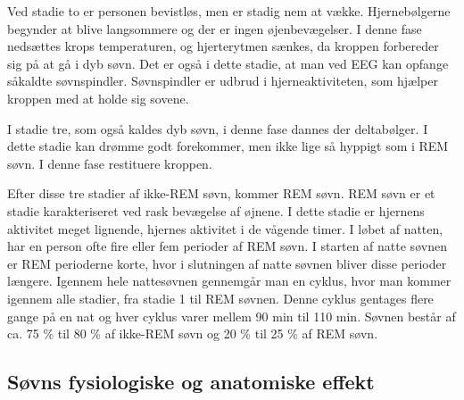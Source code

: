Ved stadie to er personen bevistløs, men er stadig nem at vække. Hjernebølgerne begynder at blive langsommere og der er ingen øjenbevægelser. I denne fase nedsættes krops temperaturen, og hjerterytmen sænkes, da kroppen forbereder sig på at gå i dyb søvn. Det er også i dette stadie, at man ved EEG kan opfange såkaldte søvnspindler. Søvnspindler er udbrud i hjerneaktiviteten, som hjælper kroppen med at holde sig sovene. \cite{Mary2011} 

I stadie tre, som også kaldes dyb søvn, i denne fase dannes der deltabølger. I dette stadie kan drømme godt forekommer, men ikke lige så hyppigt som i REM søvn. I denne fase restituere kroppen. \cite{Mary2011}  

Efter disse tre stadier af ikke-REM søvn, kommer REM søvn. REM søvn er et stadie karakteriseret ved rask bevægelse af øjnene. I dette stadie er hjernens aktivitet meget lignende, hjernes aktivitet i de vågende timer. I løbet af natten, har en person ofte fire eller fem perioder af REM søvn. I starten af natte søvnen er REM perioderne korte, hvor i slutningen af natte søvnen bliver disse perioder længere. Igennem hele nattesøvnen gennemgår man en cyklus, hvor man kommer igennem alle stadier, fra stadie 1 til REM søvnen. Denne cyklus gentages flere gange på en nat og hver cyklus varer mellem 90 min til 110 min. Søvnen består af ca. 75 \% til 80 \% af ikke-REM søvn og 20 \% til 25 \% af REM søvn. \cite{Luigi2005, Mary2011}

\subsection{Søvns fysiologiske og anatomiske effekt}

